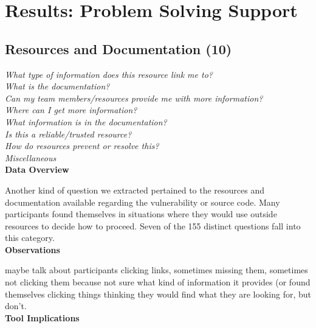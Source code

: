 \documentclass[conference]{IEEEtran}
\begin{document}
\section{Results: Problem Solving Support}
\label{sec:results-pss}



\noindent\subsection{\textbf{Resources and Documentation (10)}}\label{rd}

\noindent\emph{What type of information does this resource link me to?} \\
\emph{What is the documentation?} \\
\emph{Can my team members/resources provide me with more information?} \\
\emph{Where can I get more information?} \\
\emph{What information is in the documentation?} \\
\emph{Is this a reliable/trusted resource?} \\
\emph{How do resources prevent or resolve this?} \\
\emph{Miscellaneous} \\


\noindent\textbf{Data Overview}


Another kind of question we extracted pertained to the resources and documentation available regarding the vulnerability or source code. 
Many participants found themselves in situations where they would use outside resources to decide how to proceed. 
Seven of the 155 distinct questions fall into this category. 
\\

\noindent\textbf{Observations}

maybe talk about participants clicking links, sometimes missing them, sometimes not clicking them because not sure what kind of information it provides (or found themselves clicking things thinking they would find what they are looking for, but don't.
\\

\noindent\textbf{Tool Implications}
\end{document}
